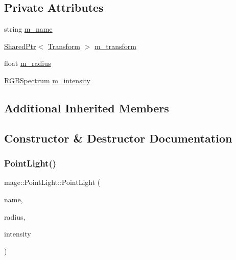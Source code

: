\subsection*{Private Attributes}
\begin{DoxyCompactItemize}
\item 
string \hyperlink{classmage_1_1_point_light_a96a5802cc2b06df700f63f8e8a9683eb}{m\+\_\+name}
\item 
\hyperlink{namespacemage_a1e01ae66713838a7a67d30e44c67703e}{Shared\+Ptr}$<$ \hyperlink{structmage_1_1_transform}{Transform} $>$ \hyperlink{classmage_1_1_point_light_a080be38309dd4dba28ac0fc65d99756e}{m\+\_\+transform}
\item 
float \hyperlink{classmage_1_1_point_light_a04459adec2eaadc457799e4399b5df1f}{m\+\_\+radius}
\item 
\hyperlink{structmage_1_1_r_g_b_spectrum}{R\+G\+B\+Spectrum} \hyperlink{classmage_1_1_point_light_ac021a08c4c700c3b19de5f7491a80e4f}{m\+\_\+intensity}
\end{DoxyCompactItemize}
\subsection*{Additional Inherited Members}


\subsection{Constructor \& Destructor Documentation}
\hypertarget{classmage_1_1_point_light_ac9d479055720799816d0489669cbd986}{}\label{classmage_1_1_point_light_ac9d479055720799816d0489669cbd986} 
\subsubsection{\texorpdfstring{Point\+Light()}{PointLight()}\hspace{0.1cm}{\footnotesize\ttfamily [1/2]}}
{\footnotesize\ttfamily mage\+::\+Point\+Light\+::\+Point\+Light (\begin{DoxyParamCaption}\item[{const string}]{name,  }\item[{float}]{radius,  }\item[{const \hyperlink{structmage_1_1_r_g_b_spectrum}{R\+G\+B\+Spectrum} \&}]{intensity }\end{DoxyParamCaption})}

